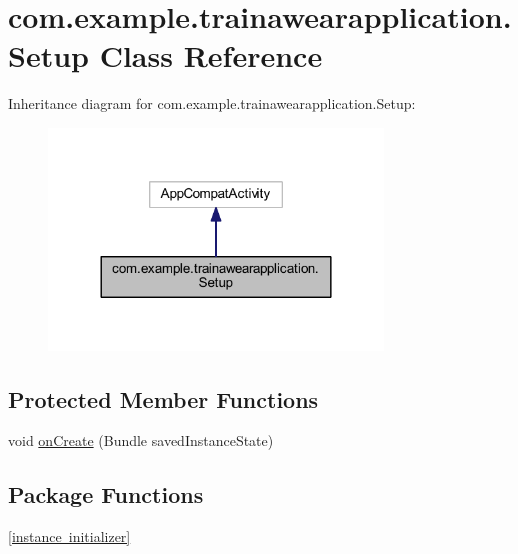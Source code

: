 \hypertarget{classcom_1_1example_1_1trainawearapplication_1_1_setup}{}\section{com.\+example.\+trainawearapplication.\+Setup Class Reference}
\label{classcom_1_1example_1_1trainawearapplication_1_1_setup}


Inheritance diagram for com.\+example.\+trainawearapplication.\+Setup\+:
\nopagebreak
\begin{figure}[H]
\begin{center}
\leavevmode
\includegraphics[width=252pt]{classcom_1_1example_1_1trainawearapplication_1_1_setup__inherit__graph}
\end{center}
\end{figure}
\subsection*{Protected Member Functions}
\begin{DoxyCompactItemize}
\item 
void \mbox{\hyperlink{classcom_1_1example_1_1trainawearapplication_1_1_setup_a52f522c34d14c93dbf7f75ff75ce606d}{on\+Create}} (Bundle saved\+Instance\+State)
\end{DoxyCompactItemize}
\subsection*{Package Functions}
\begin{DoxyCompactItemize}
\item 
\mbox{\hyperlink{classcom_1_1example_1_1trainawearapplication_1_1_setup_a542b0abbc72cfa04647cf2a63393d415}{\mbox{[}instance initializer\mbox{]}}}
\end{DoxyCompactItemize}
